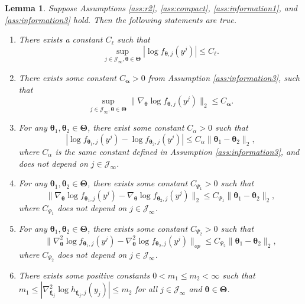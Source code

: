 \documentclass[12pt]{article}
\newcommand{\bfTheta}{\boldsymbol{\Theta}}
\newcommand{\bfalpha}{\boldsymbol{\alpha}}
\newcommand{\bftheta}{\boldsymbol{\theta}}
\newcommand{\bfxi}{\boldsymbol{\xi}}
\newtheorem{lemma}[theorem]{Lemma}
\begin{document}
\begin{lemma} \label{lemma:lemma3}
Suppose Assumptions \ref{ass:r2}, \ref{ass:compact}, \ref{ass:information1}, and \ref{ass:information3} hold. Then the following statements are true.
\begin{enumerate}
\item{There exists a constant $C_{\ell}$ such that 
\begin{equation*}
\sup_{j \in \mathcal{J}_{\infty}, \bftheta \in \bfTheta} | \log f_{\bftheta, j}(y^j) | \leq C_{\ell}.
\end{equation*}}
\item{There exists some constant $C_{\bfalpha} > 0$ from Assumption \ref{ass:information3}, such that
\begin{equation*}
\sup_{j \in \mathcal{J}_{\infty}, \bftheta \in \bfTheta} \| \nabla_{\bftheta} \log f_{\bftheta, j}(y^j) \|_2 \leq C_{\bfalpha}.
\end{equation*}
}
\item{For any $\bftheta_1, \bftheta_2 \in \bfTheta$, there exist some constant $C_{\alpha} > 0$ such that 
\begin{equation*}
| \log f_{\bftheta_1, j}(y^j) - \log f_{\bftheta_2, j}(y^j) | \leq C_{\alpha} \| \bftheta_1 - \bftheta_2 \|_2,
\end{equation*}
where $C_{\alpha}$ is the same constant defined in Assumption \ref{ass:information3}, and does not depend on $j \in \mathcal{J}_{\infty}$.}
\item{For any $\bftheta_1, \bftheta_2 \in \bfTheta$, there exists some constant $C_{\Psi_1} > 0$ such that 
\begin{equation*}
\| \nabla_{\bftheta} \log f_{\bftheta_1, j}(y^j) - \nabla_{\bftheta} \log f_{\bftheta_2, j}(y^j) \|_{2} \leq C_{\Psi_1} \| \bftheta_1 - \bftheta_2 \|_2,
\end{equation*}
where $C_{\Psi_1}$ does not depend on $j \in \mathcal{J}_{\infty}$.}
\item{For any $\bftheta_1, \bftheta_2 \in \bfTheta$, there exists some constant $C_{\Psi_2} > 0$ such that 
\begin{equation*}
\| \nabla_{\bftheta}^2 \log f_{\bftheta_1, j}(y^j) - \nabla_{\bftheta}^2 \log f_{\bftheta_2, j}(y^j) \|_{op} \leq C_{\Psi_2} \| \bftheta_1 - \bftheta_2 \|_2,
\end{equation*}
where $C_{\Psi_2}$ does not depend on $j \in \mathcal{J}_{\infty}$.}
\item{There exists some positive constants $0 < m_1 \le m_2 < \infty$ such that $m_1 \leq | \nabla_{\bfxi_j}^2 \log h_{\bfxi_j, j}(y_j)| \leq m_2$ for all $j \in\mathcal{J}_{\infty}$ and $\bftheta \in \bfTheta$.}

\end{enumerate}
\end{lemma}
\end{document}
